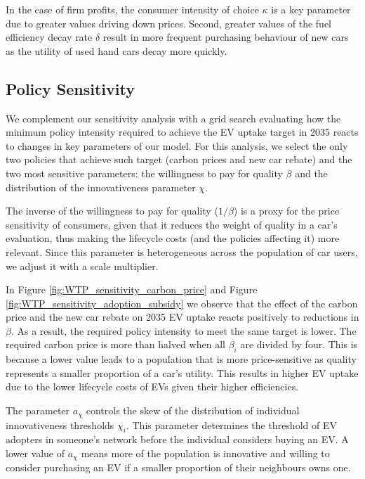 \documentclass[12pt]{article}
\begin{document}
	In the case of firm profits, the consumer intensity of choice $\kappa$ is a key parameter due to greater values driving down prices. Second, greater values of the fuel efficiency decay rate $\delta$ result in more frequent purchasing behaviour of new cars as the utility of used hand cars decay more quickly.  

    \subsection{Policy Sensitivity}
    We complement our sensitivity analysis with a grid search evaluating how the minimum policy intensity required to achieve the EV uptake target in 2035 reacts to changes in key parameters of our model. For this analysis, we select the only two policies that achieve such target (carbon prices and new car rebate) and the two most sensitive parameters: the willingness to pay for quality $\beta$ and the distribution of the innovativeness parameter $\chi$.
    
    The inverse of the willingness to pay for quality ($1/\beta$) is a proxy for the price sensitivity of consumers, given that it reduces the weight of quality in a car's evaluation, thus making the lifecycle costs (and the policies affecting it) more relevant. Since this parameter is heterogeneous across the population of car users, we adjust it with a scale multiplier.

    In Figure \ref{fig:WTP_sensitivity_carbon_price} and Figure \ref{fig:WTP_sensitivity_adoption_subsidy} we observe that the effect of the carbon price and the new car rebate on 2035 EV uptake reacts positively to reductions in $\beta$. As a result, the required policy intensity to meet the same target is lower. The required carbon price is more than halved when all $\beta_i$ are divided by four. This is because a lower value leads to a population that is more price-sensitive as quality represents a smaller proportion of a car's utility. This results in higher EV uptake due to the lower lifecycle costs of EVs given their higher efficiencies.

    The parameter $a_{\chi}$ controls the skew of the distribution of individual innovativeness thresholds $\chi_i$. This parameter determines the threshold of EV adopters in someone’s network before the individual considers buying an EV.  A lower value of $a_{\chi}$ means more of the population is innovative and willing to consider purchasing an EV if a smaller proportion of their neighbours owns one. 
    
\end{document}

